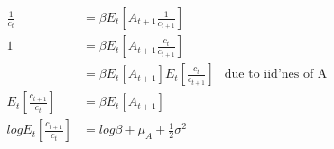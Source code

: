 \documentclass[12pt,letter]{article}
\begin{document}
\begin{align*}
\frac{1}{c_t} 	&= \beta E_t\left[ A_{t+1} \frac{1}{c_{t+1}} \right]\\
1				&= \beta E_t\left[ A_{t+1} \frac{c_t}{c_{t+1}} \right]\\
&= \beta E_t\left[ A_{t+1}\right] E_t\left[ \frac{c_t}{c_{t+1}} \right] &\text{due to iid'nes of A}\\
E_t\left[ \frac{c_{t+1}}{c_{t}} \right] &= \beta E_t\left[ A_{t+1} \right]\\
log E_t\left[ \frac{c_{t+1}}{c_{t}} \right] &= log \beta + \mu_A + \frac{1}{2}\sigma^2
\end{align*}
\end{document}
